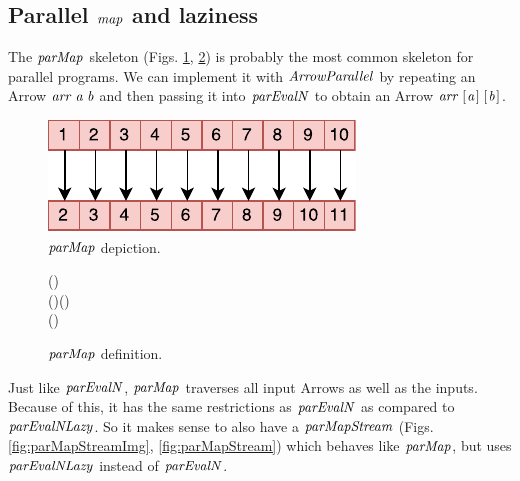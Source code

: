 \documentclass[paper=A4,twoside=true,openright,parskip=full,chapterprefix=true,headings=normal,bibliography=totoc,listof=totoc,titlepage=on,captions=tableabove,draft=false,british]{scrreprt}%
\begin{document}
\hypertarget{parallel-map-and-laziness}{%
\subsection{\texorpdfstring{Parallel \ensuremath{\Varid{map}} and
laziness}{Parallel  and laziness}}\label{parallel-map-and-laziness}}

\label{sec:parMapAndLaziness}

The \ensuremath{\Varid{parMap}} skeleton (Figs. \ref{fig:parMapImg}, \ref{fig:parMap}) is
probably the most common skeleton for parallel programs. We can
implement it with \ensuremath{\Conid{ArrowParallel}} by repeating an Arrow \ensuremath{\Varid{arr}\;\Varid{a}\;\Varid{b}} and
then passing it into \ensuremath{\Varid{parEvalN}} to obtain an Arrow \ensuremath{\Varid{arr}\;[\mskip1.5mu \Varid{a}\mskip1.5mu]\;[\mskip1.5mu \Varid{b}\mskip1.5mu]}.

\begin{figure}[h]
\centering
\includegraphics{src/img/parMap.pdf}
\caption{\ensuremath{\Varid{parMap}} depiction.\label{fig:parMapImg}}
\end{figure}

\begin{figure}[h]
\centering
\begin{hscode}\SaveRestoreHook
{}%
%
%
\>[B]{}\mathbin{::}(\;\;\;\;)\Rightarrow {}\<[E]%
\\
\>[B]{}\<[5]%
\>[5]{}\to (\;\;)\to (){}\<[E]%
\\
\>[B]{}\;\;\mathrel{=}\;\;(\;){}\<[E]%
\ColumnHook
\end{hscode}\resethooks
\caption{\ensuremath{\Varid{parMap}} definition.}\label{fig:parMap}\end{figure}

Just like \ensuremath{\Varid{parEvalN}}, \ensuremath{\Varid{parMap}} traverses all input Arrows as well as the
inputs. Because of this, it has the same restrictions as \ensuremath{\Varid{parEvalN}} as
compared to \ensuremath{\Varid{parEvalNLazy}}. So it makes sense to also have a
\ensuremath{\Varid{parMapStream}} (Figs. \ref{fig:parMapStreamImg}, \ref{fig:parMapStream})
which behaves like \ensuremath{\Varid{parMap}}, but uses \ensuremath{\Varid{parEvalNLazy}} instead of
\ensuremath{\Varid{parEvalN}}.
\end{document}
